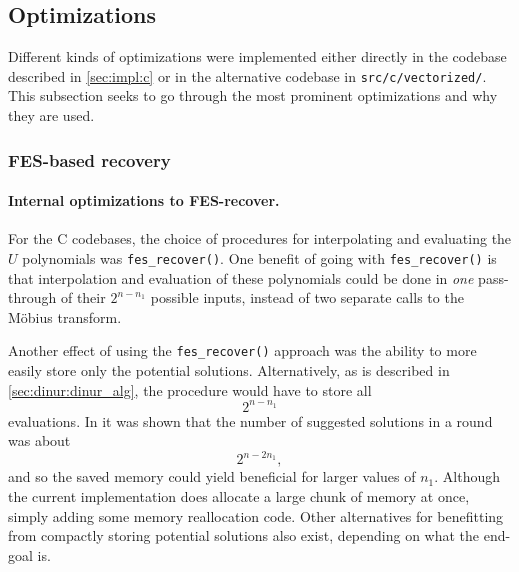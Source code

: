 \subsection{Optimizations} \label{sec:impl:opt}
Different kinds of optimizations were implemented either directly in the codebase described in \cref{sec:impl:c} or in the alternative codebase in \texttt{src/c/vectorized/}. This subsection seeks to go through the most prominent optimizations and why they are used.

\subsubsection{FES-based recovery} \label{sec:impl:opt:fes_rec}
\paragraph{Internal optimizations to FES-recover.} For the C codebases, the choice of procedures for interpolating and evaluating the $U$ polynomials was \texttt{fes\_recover()}. One benefit of going with \texttt{fes\_recover()} is that interpolation and evaluation of these polynomials could be done in \textit{one} pass-through of their $2^{n - n_1}$ possible inputs, instead of two separate calls to the Möbius transform.

Another effect of using the \texttt{fes\_recover()} approach was the ability to more easily store only the potential solutions. Alternatively, as is described in \cref{sec:dinur:dinur_alg}, the procedure would have to store all 
$$
    2^{n - n_1}
$$ 
evaluations. In \cite{eurocrypt-2021-30841} it was shown that the number of suggested solutions in a round was about 
$$
    2^{n - 2n_1},
$$
and so the saved memory could yield beneficial for larger values of $n_1$. Although the current implementation does allocate a large chunk of memory at once, simply adding some memory reallocation code. Other alternatives for benefitting from compactly storing potential solutions also exist, depending on what the end-goal is.

